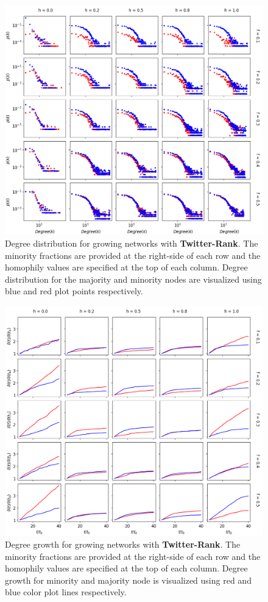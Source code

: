 \begin{figure}[h!]
	\centering
	\includegraphics[width=1.0\textwidth]{images/dd_growth_tr.png}
	\caption{Degree distribution for growing networks with \textbf{Twitter-Rank}. The minority fractions are provided at the right-side of each row and the homophily values are specified at the top of each column. Degree distribution for the majority and minority nodes are visualized using blue and red plot points respectively.}
	\label{dd_growth_tr_fig}
\end{figure}

\begin{figure}[h!]
	\centering
	\includegraphics[width=1.0\textwidth]{images/dg_growth_tr.png}
	\caption{Degree growth for growing networks with \textbf{Twitter-Rank}. The minority fractions are provided at the right-side of each row and the homophily values are specified at the top of each column. Degree growth for minority and majority node is visualized using red and blue color plot lines respectively.}
	\label{dg_growth_tr_fig}
\end{figure}

